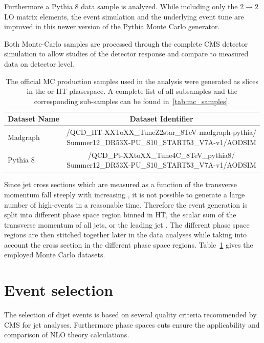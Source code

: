 Furthermore a Pythia 8 data sample is analyzed. While including only the $2
\rightarrow 2$ LO matrix elements, the event simulation and the underlying event
tune are improved in this newer version of the Pythia Monte Carlo generator.

Both Monte-Carlo samples are processed through the complete CMS detector
simulation to allow studies of the detector response and compare to measured
data on detector level. 
\begin{table}[htp]
    \centering
    \caption[Monte Carlo datasets]{The official MC production samples used in
    the analysis were generated as slices in the \pt or HT phasespace. A
    complete list of all subsamples and the corresponding sub-samples can be found
     in~\ref{tab:mc_samples}.}
    \label{tab:montecarlo:datasets}
    \begin{tabular}{lc}
    \toprule
    Dataset Name & Dataset Identifier\\\midrule
    Madgraph & \makecell[l]{/QCD\_HT-XXToXX\_TuneZ2star\_8TeV-madgraph-pythia/\\
        \phantom{aaaa}Summer12\_DR53X-PU\_S10\_START53\_V7A-v1/AODSIM}\\
        Pythia 8 & \makecell[l]{/QCD\_Pt-XXtoXX\_Tune4C\_8TeV\_pythia8/\\
        \phantom{aaaa}Summer12\_DR53X-PU\_S10\_START53\_V7A-v1/AODSIM}\\
    \bottomrule
    \end{tabular}
\end{table}

Since jet cross sections which are measured as a function of the transverse
momentum fall steeply with increasing \pt, it is not possible to generate a
large number of high-\pt events in a reasonable time. Therefore the event
generation is split into different phase space region binned in HT, the scalar
sum of the transverse momentum of all jets, or the leading jet \pt. The
different phase space regions are then stitched together later in the data
analyses while taking into account the cross section in the different phase
space regions.  Table~\ref{tab:montecarlo:datasets} gives the employed Monte
Carlo datasets.

\section{Event selection}
\label{sec:event_selection}

The selection of dijet events is based on several quality criteria recommended by CMS
for jet analyses. Furthermore phase spaces cuts ensure the applicability and
comparison of NLO theory calculations.


